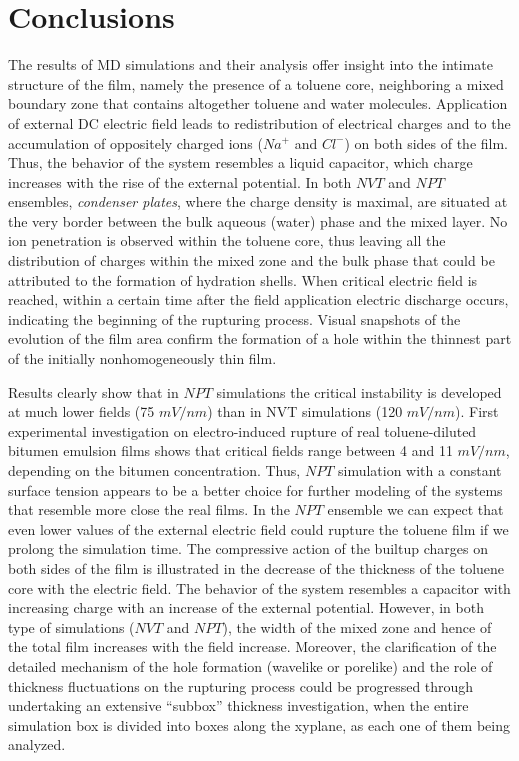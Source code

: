 \section{Conclusions}
The results of MD simulations and their analysis offer insight into the intimate structure of the film, namely the presence of a toluene core, neighboring a mixed boundary zone that contains altogether toluene and water molecules.  Application of external DC electric field leads to redistribution of electrical charges and to the accumulation of oppositely charged ions ($Na^+$ and $Cl^-$) on both sides of the film. Thus, the behavior of the system resembles a liquid capacitor, which charge increases with the rise of the external potential. 
In both $NVT$ and $NPT$ ensembles, {\it condenser plates}, where the charge density is maximal, are situated at the very  border between the bulk aqueous (water) phase and the mixed layer. No ion penetration is observed within the toluene core, thus leaving all the distribution of charges within the mixed zone and the bulk phase that could be attributed to the formation of hydration shells. When critical electric field is reached, within a certain time after the field application electric discharge occurs, indicating the beginning of the rupturing process. Visual snapshots of the evolution of the film area confirm the formation of a hole within the thinnest part of the initially non\textendash homogeneously thin film. 

Results clearly show that in $NPT$ simulations the critical instability is developed at much lower fields (75 $mV/nm$) than in NVT simulations (120 $mV/nm$). First experimental investigation on electro-induced rupture of real toluene-diluted bitumen emulsion films \cite{Panchev200874} shows that critical fields range between 4 and 11 $mV/nm$, depending on the bitumen concentration. Thus, $NPT$ simulation with a constant surface tension appears to be a better choice for further modeling of the systems that resemble more close the real films.
In the $NPT$ ensemble  we can expect that even lower values of the external electric field could rupture the toluene film if we prolong the simulation time. The compressive  action of the built\textendash up charges on both sides of the film is illustrated in the decrease of the thickness of the toluene core with the electric field. The behavior of the system resembles a capacitor with increasing charge with an increase of the external potential. However, in both type of simulations ($NVT$ and $NPT$), the width of the mixed zone and hence of the total film increases with the field increase. 
Moreover, the clarification of the detailed mechanism of the hole formation (wave\textendash like or pore\textendash like) and the role of thickness fluctuations on the rupturing process could be progressed through undertaking an extensive ``subbox'' thickness investigation, when the entire simulation box is divided into boxes along the xy\textendash plane, as each one of them being analyzed. 

